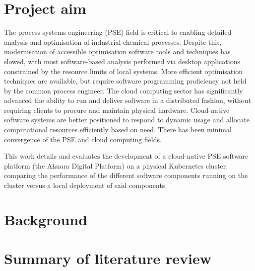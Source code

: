 \section{Project aim}

The process systems engineering (PSE) field is critical to enabling detailed analysis and optimisation of industrial chemical processes. Despite this, modernisation of accessible optimisation software tools and techniques has slowed, with most software-based analysis performed via desktop applications constrained by the resource limits of local systems. More efficient optimisation techniques are available, but require software programming proficiency not held by the common process engineer. The cloud computing sector has significantly advanced the ability to run and deliver software in a distributed fashion, without requiring clients to procure and maintain physical hardware. Cloud-native software systems are better positioned to respond to dynamic usage and allocate computational resources efficiently based on need. There has been minimal convergence of the PSE and cloud computing fields.

This work details and evaluates the development of a cloud-native PSE software platform (the Ahuora Digital Platform) on a physical Kubernetes cluster, comparing the performance of the different software components running on the cluster versus a local deployment of said components.

\section{Background}

\section{Summary of literature review}